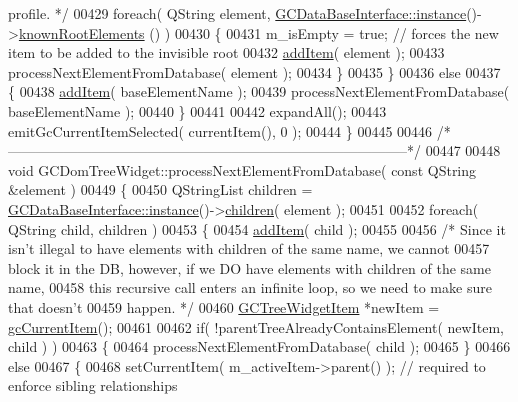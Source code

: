 \begin{DoxyCode}
{       profile. */}
00429     \textcolor{keywordflow}{foreach}( QString element, \hyperlink{class_g_c_data_base_interface_a1baea9c0667aa8b610ec30076fcab84c}{GCDataBaseInterface::instance}()->\hyperlink{class_g_c_data_base_interface_ac5c57277f9476ab74cfe13fbcee52f15}{knownRootElements}
      () )
00430     \{
00431       m\_isEmpty = \textcolor{keyword}{true};   \textcolor{comment}{// forces the new item to be added to the invisible
       root}
00432       \hyperlink{class_g_c_dom_tree_widget_adbbe1eeb6dc9a2d6c84a7133106a7f77}{addItem}( element );
00433       processNextElementFromDatabase( element );
00434     \}
00435   \}
00436   \textcolor{keywordflow}{else}
00437   \{
00438     \hyperlink{class_g_c_dom_tree_widget_adbbe1eeb6dc9a2d6c84a7133106a7f77}{addItem}( baseElementName );
00439     processNextElementFromDatabase( baseElementName );
00440   \}
00441 
00442   expandAll();
00443   emitGcCurrentItemSelected( currentItem(), 0 );
00444 \}
00445 
00446 \textcolor{comment}{/*
      --------------------------------------------------------------------------------------*/}
00447 
00448 \textcolor{keywordtype}{void} GCDomTreeWidget::processNextElementFromDatabase( \textcolor{keyword}{const} QString &element )
00449 \{
00450   QStringList children = \hyperlink{class_g_c_data_base_interface_a1baea9c0667aa8b610ec30076fcab84c}{GCDataBaseInterface::instance}()->\hyperlink{class_g_c_data_base_interface_aab5126783bc3acc7c718c8ffd8af62bc}{children}( element );
00451 
00452   \textcolor{keywordflow}{foreach}( QString child, children )
00453   \{
00454     \hyperlink{class_g_c_dom_tree_widget_adbbe1eeb6dc9a2d6c84a7133106a7f77}{addItem}( child );
00455 
00456     \textcolor{comment}{/* Since it isn't illegal to have elements with children of the same name,
       we cannot}
00457 \textcolor{comment}{      block it in the DB, however, if we DO have elements with children of the
       same name,}
00458 \textcolor{comment}{      this recursive call enters an infinite loop, so we need to make sure that
       doesn't}
00459 \textcolor{comment}{      happen. */}
00460     \hyperlink{class_g_c_tree_widget_item}{GCTreeWidgetItem} *newItem = \hyperlink{class_g_c_dom_tree_widget_a70d6a155777d375f3923c2d66e702d15}{gcCurrentItem}();
00461 
00462     \textcolor{keywordflow}{if}( !parentTreeAlreadyContainsElement( newItem, child ) )
00463     \{
00464       processNextElementFromDatabase( child );
00465     \}
00466     \textcolor{keywordflow}{else}
00467     \{
00468       setCurrentItem( m\_activeItem->parent() );  \textcolor{comment}{// required to enforce sibling
       relationships}

\end{DoxyCode}
